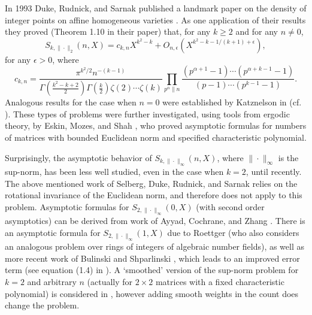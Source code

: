 \documentclass[reqno]{amsart}
\begin{document}
In 1993 Duke, Rudnick, and Sarnak published a landmark paper on the density of integer points on affine homogeneous varieties \cite{DukeRudnSarn1993}. As one application of their results they proved (Theorem 1.10 in their paper) that, for any $k\ge 2$ and for any $n\not= 0$,
\begin{equation}\label{eqn.DRS0}
	S_{k,\|\cdot\|_2}(n,X)=c_{k,n}X^{k^2-k}+O_{n,\epsilon}\left(X^{k^2-k-1/(k+1)+\epsilon}\right),
\end{equation}
for any $\epsilon>0$, where
\begin{equation*}
c_{k,n}=\frac{\pi^{k^2/2}n^{-(k-1)}}{\Gamma\left(\frac{k^2-k+2}{2}\right)\Gamma\left(\frac{k}{2}\right)\zeta(2)\cdots\zeta(k)}\prod_{p^\alpha\| n}\frac{(p^{\alpha+1}-1)\cdots (p^{\alpha+k-1}-1)}{(p-1)\cdots (p^{k-1}-1)}.
\end{equation*}
Analogous results for the case when $n=0$ were established by Katznelson in \cite{Katz1993} (cf. \cite{Katz1994}). These types of problems were further investigated, using tools from ergodic theory, by Eskin, Mozes, and Shah \cite{EskiMozeShah1996,Shah2000}, who proved asymptotic formulas for numbers of matrices with bounded Euclidean norm and specified characteristic polynomial.

Surprisingly, the asymptotic behavior of $S_{k,\|\cdot\|_\infty}(n,X)$, where $\|\cdot\|_\infty$ is the sup-norm, has been less well studied, even in the case when $k=2$, until recently. The above mentioned work of Selberg, Duke, Rudnick, and Sarnak relies on the rotational invariance of the Euclidean norm, and therefore does not apply to this problem. Asymptotic formulas for $S_{2,\|\cdot\|_\infty}(0,X)$ (with second order asymptotics) can be derived from work of Ayyad, Cochrane, and Zhang \cite{AyyaCochZhan1996}. There is an asymptotic formula for $S_{2,\|\cdot\|_\infty}(1,X)$ due to Roettger \cite{Roet2005} (who also considers an analogous problem over rings of integers of algebraic number fields), as well as more recent work of Bulinski and Shparlinski \cite{BuliShpa2024}, which leads to an improved error term (see equation (1.4) in \cite{Afif2024}). A `smoothed' version of the sup-norm problem for $k=2$ and arbitrary $n$ (actually for $2\times 2$ matrices with a fixed characteristic polynomial) is considered in \cite{Guri2024}, however adding smooth weights in the count does change the problem.
\end{document}
